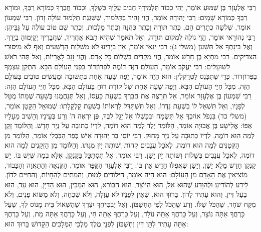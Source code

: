 רַבִּי אֶלְעָזָר בֶּן שַׁמּוּעַ אוֹמֵר, יְהִי כְבוֹד תַּלְמִידְךָ חָבִיב עָלֶיךָ כְּשֶׁלְּךָ, וּכְבוֹד חֲבֵרְךָ כְּמוֹרָא רַבְּךָ, וּמוֹרָא רַבְּךָ כְּמוֹרָא שָׁמָיִם:
רַבִּי יְהוּדָה אוֹמֵר, הֱוֵי זָהִיר בַּתַּלְמוּד, שֶׁשִּׁגְגַת תַּלְמוּד עוֹלָה זָדוֹן. רַבִּי שִׁמְעוֹן אוֹמֵר, שְׁלשָׁה כְתָרִים הֵם, כֶּתֶר תּוֹרָה וְכֶתֶר כְּהֻנָּה וְכֶתֶר מַלְכוּת, וְכֶתֶר שֵׁם טוֹב עוֹלֶה עַל גַּבֵּיהֶן:
רַבִּי נְהוֹרַאי אוֹמֵר, הֱוֵי גוֹלֶה לִמְקוֹם תּוֹרָה, וְאַל תֹּאמַר שֶׁהִיא תָבֹא אַחֲרֶיךָ, שֶׁחֲבֵרֶיךָ יְקַיְּמוּהָ בְיָדֶךָ. וְאֶל בִּינָתְךָ אַל תִּשָּׁעֵן (משלי ג):
רַבִּי יַנַּאי אוֹמֵר, אֵין בְּיָדֵינוּ לֹא מִשַּׁלְוַת הָרְשָׁעִים וְאַף לֹא מִיִּסּוּרֵי הַצַּדִּיקִים. רַבִּי מַתְיָא בֶן חָרָשׁ אוֹמֵר, הֱוֵי מַקְדִּים בִּשְׁלוֹם כָּל אָדָם. וֶהֱוֵי זָנָב לָאֲרָיוֹת, וְאַל תְּהִי רֹאשׁ לַשּׁוּעָלִים:
רַבִּי יַעֲקֹב אוֹמֵר, הָעוֹלָם הַזֶּה דּוֹמֶה לִפְרוֹזְדוֹר בִּפְנֵי הָעוֹלָם הַבָּא. הַתְקֵן עַצְמְךָ בַפְּרוֹזְדוֹר, כְּדֵי שֶׁתִּכָּנֵס לַטְּרַקְלִין:
הוּא הָיָה אוֹמֵר, יָפָה שָׁעָה אַחַת בִּתְשׁוּבָה וּמַעֲשִׂים טוֹבִים בָּעוֹלָם הַזֶּה, מִכָּל חַיֵּי הָעוֹלָם הַבָּא. וְיָפָה שָׁעָה אַחַת שֶׁל קוֹרַת רוּחַ בָּעוֹלָם הַבָּא, מִכָּל חַיֵּי הָעוֹלָם הַזֶּה:
רַבִּי שִׁמְעוֹן בֶּן אֶלְעָזָר אוֹמֵר, אַל תְּרַצֶּה אֶת חֲבֵרְךָ בִשְׁעַת כַּעֲסוֹ, וְאַל תְּנַחֲמֶנּוּ בְּשָׁעָה שֶׁמֵּתוֹ מֻטָּל לְפָנָיו, וְאַל תִּשְׁאַל לוֹ בִשְׁעַת נִדְרוֹ, וְאַל תִּשְׁתַּדֵּל לִרְאוֹתוֹ בִשְׁעַת קַלְקָלָתוֹ:
שְׁמוּאֵל הַקָּטָן אוֹמֵר, (משלי כד) בִּנְפֹל אוֹיִבְךָ אַל תִּשְׂמָח וּבִכָּשְׁלוֹ אַל יָגֵל לִבֶּךָ, פֶּן יִרְאֶה ה' וְרַע בְּעֵינָיו וְהֵשִׁיב מֵעָלָיו אַפּוֹ:
אֱלִישָׁע בֶּן אֲבוּיָה אוֹמֵר, הַלּוֹמֵד יֶלֶד לְמַה הוּא דוֹמֶה, לִדְיוֹ כְתוּבָה עַל נְיָר חָדָשׁ. וְהַלּוֹמֵד זָקֵן לְמַה הוּא דוֹמֶה, לִדְיוֹ כְתוּבָה עַל נְיָר מָחוּק. רַבִּי יוֹסֵי בַר יְהוּדָה אִישׁ כְּפַר הַבַּבְלִי אוֹמֵר, הַלּוֹמֵד מִן הַקְּטַנִּים לְמַה הוּא דוֹמֶה, לְאֹכֵל עֲנָבִים קֵהוֹת וְשׁוֹתֶה יַיִן מִגִּתּוֹ. וְהַלּוֹמֵד מִן הַזְּקֵנִים לְמַה הוּא דוֹמֶה, לְאֹכֵל עֲנָבִים בְּשֵׁלוֹת וְשׁוֹתֶה יַיִן יָשָׁן. רַבִּי אוֹמֵר, אַל תִּסְתַּכֵּל בַּקַּנְקַן, אֶלָּא בְמַה שֶּׁיֶּשׁ בּוֹ. יֵשׁ קַנְקַן חָדָשׁ מָלֵא יָשָׁן, וְיָשָׁן שֶׁאֲפִלּוּ חָדָשׁ אֵין בּוֹ:
רַבִּי אֶלְעָזָר הַקַּפָּר אוֹמֵר, הַקִּנְאָה וְהַתַּאֲוָה וְהַכָּבוֹד, מוֹצִיאִין אֶת הָאָדָם מִן הָעוֹלָם:
הוּא הָיָה אוֹמֵר, הַיִּלּוֹדִים לָמוּת, וְהַמֵּתִים לְהֵחָיוֹת, וְהַחַיִּים לִדּוֹן. לֵידַע לְהוֹדִיעַ וּלְהִוָּדַע שֶׁהוּא אֵל, הוּא הַיּוֹצֵר, הוּא הַבּוֹרֵא, הוּא הַמֵּבִין, הוּא הַדַּיָּן, הוּא עֵד, הוּא בַעַל דִּין, וְהוּא עָתִיד לָדוּן. בָּרוּךְ הוּא, שֶׁאֵין לְפָנָיו לֹא עַוְלָה, וְלֹא שִׁכְחָה, וְלֹא מַשּׂוֹא פָנִים, וְלֹא מִקַּח שֹׁחַד, שֶׁהַכֹּל שֶׁלּוֹ. וְדַע שֶׁהַכֹּל לְפִי הַחֶשְׁבּוֹן. וְאַל יַבְטִיחֲךָ יִצְרְךָ שֶׁהַשְּׁאוֹל בֵּית מָנוֹס לְךָ, שֶׁעַל כָּרְחֲךָ אַתָּה נוֹצָר, וְעַל כָּרְחֲךָ אַתָּה נוֹלָד, וְעַל כָּרְחֲךָ אַתָּה חַי, וְעַל כָּרְחֲךָ אַתָּה מֵת, וְעַל כָּרְחֲךָ אַתָּה עָתִיד לִתֵּן דִּין וְחֶשְׁבּוֹן לִפְנֵי מֶלֶךְ מַלְכֵי הַמְּלָכִים הַקָּדוֹשׁ בָּרוּךְ הוּא:

